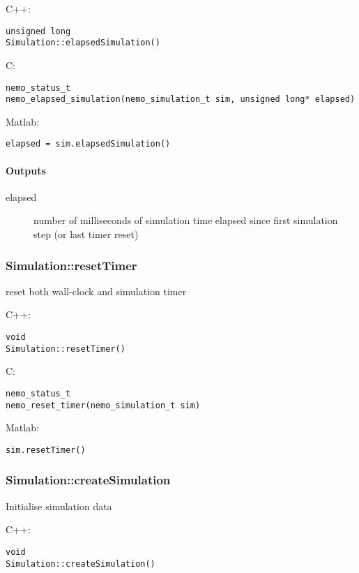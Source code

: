 \noindent C++:
\begin{lstlisting}[aboveskip=2pt]
unsigned long
Simulation::elapsedSimulation()
\end{lstlisting}

\noindent C:
\begin{lstlisting}[aboveskip=2pt]
nemo_status_t
nemo_elapsed_simulation(nemo_simulation_t sim, unsigned long* elapsed)
\end{lstlisting}

\noindent Matlab:
\begin{lstlisting}[aboveskip=2pt]
elapsed = sim.elapsedSimulation()
\end{lstlisting}
\paragraph{Outputs}
\begin{description}
\item[elapsed] number of milliseconds of simulation time elapsed since first simulation step (or last timer reset)
\end{description}

\clearpage
\subsubsection*{Simulation::resetTimer}
\label{fn: resetTimer}
reset both wall-clock and simulation timer


\noindent C++:
\begin{lstlisting}[aboveskip=2pt]
void
Simulation::resetTimer()
\end{lstlisting}

\noindent C:
\begin{lstlisting}[aboveskip=2pt]
nemo_status_t
nemo_reset_timer(nemo_simulation_t sim)
\end{lstlisting}

\noindent Matlab:
\begin{lstlisting}[aboveskip=2pt]
sim.resetTimer()
\end{lstlisting}

\clearpage
\subsubsection*{Simulation::createSimulation}
\label{fn: createSimulation}
Initialise simulation data


\noindent C++:
\begin{lstlisting}[aboveskip=2pt]
void
Simulation::createSimulation()
\end{lstlisting}

